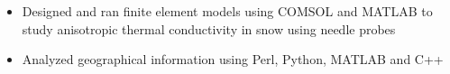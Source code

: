 \begin{itemize}
  \item Designed and ran finite element models using COMSOL and MATLAB to study
  anisotropic thermal conductivity in snow using needle probes
  \item Analyzed geographical information using Perl, Python, MATLAB and C++
\end{itemize}
